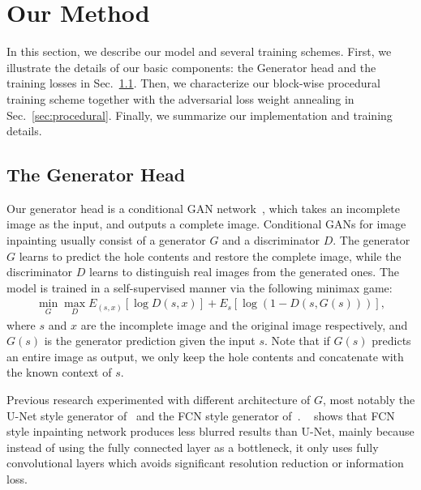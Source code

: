 \section{Our Method}

In this section, we describe our model and several training schemes. First, we illustrate the details of our basic components: the Generator head and the training losses in Sec.~\ref{sec:resnet_head}. Then, we characterize our block-wise procedural training scheme together with the adversarial loss weight annealing in Sec.~\ref{sec:procedural}. Finally, we summarize our implementation and training details. 

\subsection{The Generator Head}
\label{sec:resnet_head}

Our generator head is a conditional GAN network~\cite{mirza2014conditional}, which takes an incomplete image as the input, and outputs a complete image. Conditional GANs for image inpainting usually consist of a generator $G$ and a discriminator $D$. The generator $G$ learns to predict the hole contents and restore the complete image, while the discriminator $D$ learns to distinguish real images from the generated ones. The model is trained in a self-supervised manner via the following minimax game:
\begin{eqnarray}
\min\limits_G \max\limits_D E_{(s,x)}[\log D(s,x)] + E_s[\log (1-D(s,G(s)))],
\end{eqnarray}
where $s$ and $x$ are the incomplete image and the original image respectively, and $G(s)$ is the generator prediction given the input $s$. Note that if $G(s)$ predicts an entire image as output, we only keep the hole contents and concatenate with the known context of $s$.

Previous research experimented with different architecture of $G$, most notably the U-Net style generator of~\cite{pathak2016context} and the FCN style generator of~\cite{iizuka2017globally}. ~\cite{iizuka2017globally} shows that FCN style inpainting network produces less blurred results than U-Net, mainly because instead of using the fully connected layer as a bottleneck, it only uses fully convolutional layers which avoids significant resolution reduction or information loss.


